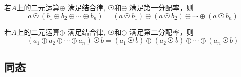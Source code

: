 \begin{Theorem}
若$A$上的二元运算$\oplus$ 满足结合律, $ \astrosun $和$\oplus $ 满足第一分配率，则
$$
a \, \astrosun \, ( b_1 \oplus b_2 \oplus \cdots \oplus b_n ) =  ( a \, \astrosun \, b_1) \oplus (a \, \astrosun \, b_2) \oplus \cdots \oplus (a \, \astrosun \, b_n)
$$
\end{Theorem}

\begin{Theorem}
若$A$上的二元运算$\oplus$ 满足结合律, $ \astrosun $和$\oplus $ 满足第二分配率，则
$$
( a_1 \oplus a_2 \oplus \cdots \oplus a_n ) \, \astrosun \, b =  ( a_1 \, \astrosun \, b) \oplus ( a_2 \, \astrosun \, b) \oplus \cdots \oplus (  a_n \, \astrosun \, b)
$$
\end{Theorem}

\subsection{同态}




